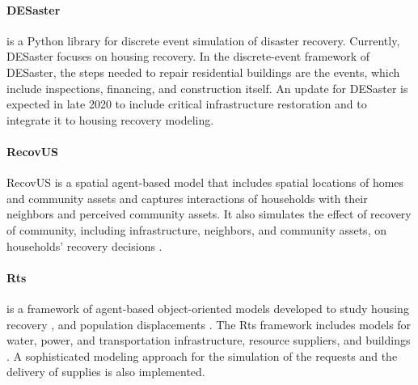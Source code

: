 \paragraph{DESaster} 
 is a Python library for discrete event simulation of disaster recovery. Currently, DESaster focuses on housing recovery. In the discrete-event framework of DESaster, the steps needed to repair residential buildings are the events, which include inspections, financing, and construction itself. An update for DESaster is expected in late 2020 to include critical infrastructure restoration and to integrate it to housing recovery modeling.

\paragraph{RecovUS}  
RecovUS is a spatial agent-based model that includes spatial locations of homes and community assets and captures interactions of households with their neighbors and perceived community assets. It also simulates the effect of recovery of community, including infrastructure, neighbors, and community assets, on households' recovery decisions \citep{moradi2020recovus}. 

\paragraph{Rts}  is a framework of agent-based object-oriented models developed to study housing recovery \citep{costa2020housing}, and population displacements \citep{costa2020predicting}. The Rts framework includes models for water, power, and transportation infrastructure, resource suppliers, and buildings \citep{Costa2019thesis}. A sophisticated modeling approach for the simulation of the requests and the delivery of supplies is also implemented.

